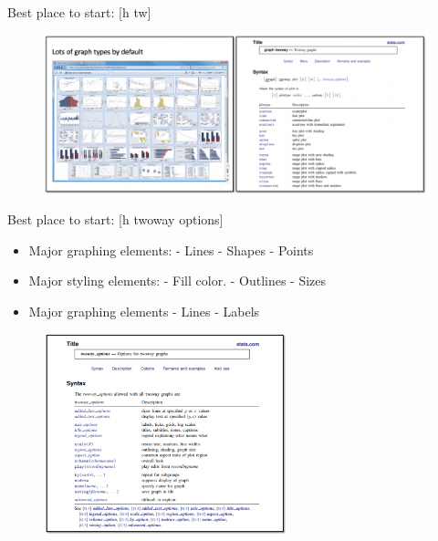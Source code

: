 \documentclass[aspectratio=169]{beamer}
\begin{document}
\begin{frame}{Best place to start: [h tw]}
	
	\begin{figure}
		\centering
		\includegraphics[width=\linewidth]{img/Graphing}
	\end{figure}
	
\end{frame}


\begin{frame}{Best place to start: [h twoway options]}
	\begin{multicols}{2}	
		
		\begin{itemize}[<default overlay specification>]
			\item<1> Major graphing elements:
				\newline - Lines
				\newline - Shapes
				\newline - Points
			\item<1> Major styling elements:
				\newline - Fill color.
				\newline - Outlines
				\newline - Sizes
			\item<1> Major graphing elements
				\newline - Lines
				\newline - Labels
		\end{itemize}
		
		\begin{figure}
			\centering
			\includegraphics[width=70mm]{img/Graphing2}
		\end{figure}
		
	\end{multicols}
\end{frame}
\end{document}
